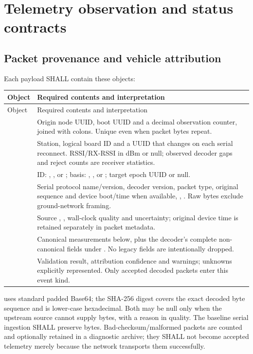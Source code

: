 \section{Telemetry observation and status contracts}\label{sec:observations}
\subsection{Packet provenance and vehicle attribution}
Each  payload SHALL contain these objects:
\begin{longtable}{L{34mm}L{127mm}}
\toprule Object & Required contents and interpretation\\\midrule
\endfirsthead
\toprule Object & Required contents and interpretation\\\midrule
\endhead
{} & Origin node UUID, boot UUID and a decimal observation counter, joined with colons. Unique even when packet bytes repeat.\\
 & Station, logical board ID and a  UUID that changes on each serial reconnect. RSSI/RX-RSSI in dBm or null; observed decoder gaps and reject counts are receiver statistics.\\
 & ID: , ,  or ; basis: , ,  or ; target epoch UUID or null.\\
 & Serial protocol name/version, decoder version, packet type, original sequence and device boot/time when available, , . Raw bytes exclude ground-network framing.\\
 & Source , , wall-clock quality and uncertainty; original device time is retained separately in packet metadata.\\
 & Canonical measurements below, plus the decoder's complete non-canonical fields under . No legacy fields are intentionally dropped.\\
 & Validation result, attribution confidence and warnings; unknowns explicitly represented. Only accepted decoded packets enter this event kind.\\
\bottomrule
\end{longtable}

 uses standard padded Base64; the SHA-256 digest covers the exact
decoded byte sequence and is lower-case hexadecimal. Both may be null only when
the upstream source cannot supply bytes, with a reason in quality. The baseline
serial ingestion SHALL preserve bytes. Bad-checksum/malformed packets are counted
and optionally retained in a diagnostic archive; they SHALL not become accepted
telemetry merely because the network transports them successfully.

